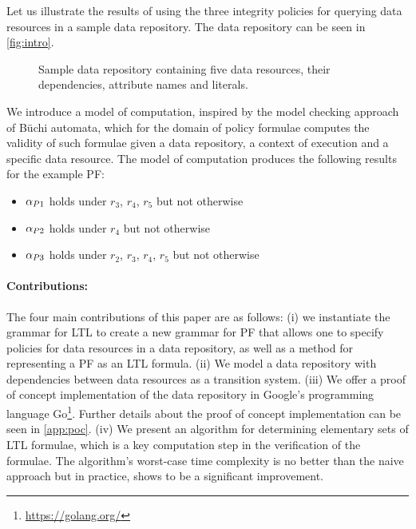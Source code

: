 Let us illustrate the results of using the three integrity policies for querying data resources in a sample data repository. The data repository can be seen in \autoref{fig:intro}.
\begin{figure}[!ht]
    \begin{center}
        
        \caption{Sample data repository containing five data resources, their dependencies, attribute names and literals.}
        \label{fig:intro}
    \end{center}
\end{figure}
We introduce a model of computation, inspired by the model checking approach of Büchi automata, which for the domain of policy formulae computes the validity of such formulae given a data repository, a context of execution and a specific data resource. The model of computation produces the following results for the example PF:
\begin{itemize}
    \item $\alpha_{P1}$ holds under $r_3$, $r_4$, $r_5$ but not otherwise
    \item $\alpha_{P2}$ holds under $r_4$ but not otherwise
    \item $\alpha_{P3}$ holds under $r_2$, $r_3$, $r_4$, $r_5$ but not otherwise
\end{itemize}

\paragraph{Contributions:} The four main contributions of this paper are as follows: (i) we instantiate the grammar for LTL to create a new grammar for PF that allows one to specify policies for data resources in a data repository, as well as a method for representing a PF as an LTL formula. (ii) We model a data repository with dependencies between data resources as a transition system. (iii) We offer a proof of concept implementation of the data repository in Google's programming language Go\footnote{\href{https://golang.org/}{https://golang.org/}}. Further details about the proof of concept implementation can be seen in \autoref{app:poc}. (iv) We present an algorithm for determining elementary sets of LTL formulae, which is a key computation step in the verification of the formulae. The algorithm's worst-case time complexity is no better than the naive approach but in practice, shows to be a significant improvement.

